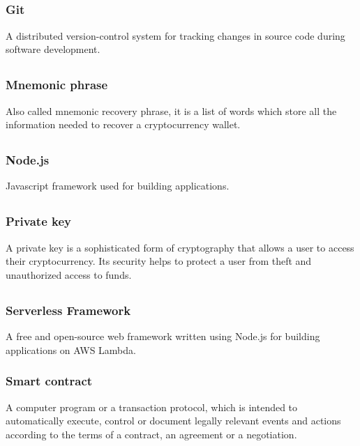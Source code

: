 	\subsection*{}
		\subsubsection*{Git}
			A distributed version-control system for tracking changes in source code during software development.
			
	\subsection*{}
		\subsubsection*{Mnemonic phrase}
			Also called mnemonic recovery phrase, it is a list of words which store all the information needed to recover a cryptocurrency wallet.
	
	\subsection*{}
		\subsubsection*{Node.js}
			Javascript framework used for building applications. 
	
	\subsection*{}
		\subsubsection*{Private key}
			A private key is a sophisticated form of cryptography that allows a user to access their cryptocurrency. Its security helps to protect a user from theft and unauthorized access to funds.
	
	\subsection*{}
		\subsubsection*{Serverless Framework}
			A free and open-source web framework written using Node.js for building applications on AWS Lambda.
			
		\subsubsection*{Smart contract}
			A computer program or a transaction protocol, which is intended to automatically execute, control or document legally relevant events and actions according to the terms of a contract, an agreement or a negotiation.
